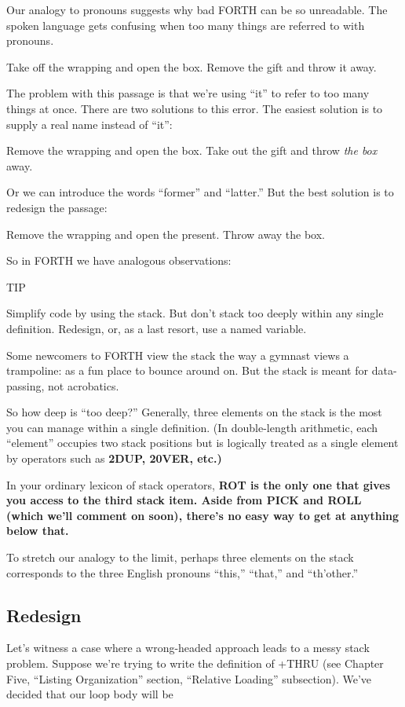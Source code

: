Our analogy to pronouns suggests why bad FORTH can be so unreadable.
The spoken language gets confusing when too many things are
referred to with pronouns.

Take off the wrapping and open the box. Remove the gift and throw it
away.

The problem with this passage is that we're using ``it'' to refer to too
many things at once. There are two solutions to this error. The easiest
solution is to supply a real name instead of ``it'':

Remove the wrapping and open the box. Take out the gift and throw
\emph{the box} away.

Or we can introduce the words ``former'' and ``latter.'' But the best
solution is to redesign the passage:

Remove the wrapping and open the present. Throw away the box.

So in FORTH we have analogous observations:

TIP

Simplify code by using the stack. But don't stack too deeply within any
single definition. Redesign, or, as a last resort, use a named variable.

Some newcomers to FORTH view the stack the way a gymnast views a
trampoline: as a fun place to bounce around on. But the stack is meant for
data-passing, not acrobatics.

So how deep is ``too deep?'' Generally, three elements on the stack is
the most you can manage within a single definition. (In double-length
arithmetic, each ``element'' occupies two stack positions but is logically
treated as a single element by operators such as \bf{2DUP}, \bf{20VER},
etc.)

In your ordinary lexicon of stack operators, \bf{ROT} is the only one
that gives you access to the third stack item. Aside from \bf{PICK} and
\bf{ROLL} (which we'll comment on soon), there's no easy way to get at
anything below that.

To stretch our analogy to the limit, perhaps three elements on the
stack corresponds to the three English pronouns ``this,'' ``that,'' and
``th'other.''

\subsection{Redesign}

Let's witness a case where a wrong-headed approach leads to a messy
stack problem. Suppose we're trying to write the definition of +THRU
(see Chapter Five, ``Listing Organization'' section, ``Relative Loading''
subsection). We've decided that our loop body will be

